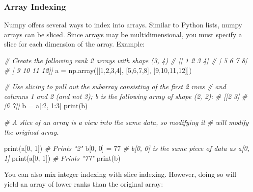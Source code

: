 \documentclass[
]{article}
\newenvironment{Shaded}{}{}
\newcommand{\BuiltInTok}[1]{#1}
\newcommand{\CommentTok}[1]{\textcolor[rgb]{0.38,0.63,0.69}{\textit{#1}}}
\newcommand{\DecValTok}[1]{\textcolor[rgb]{0.25,0.63,0.44}{#1}}
\newcommand{\NormalTok}[1]{#1}
\newcommand{\OperatorTok}[1]{\textcolor[rgb]{0.40,0.40,0.40}{#1}}
\begin{document}
\hypertarget{array-indexing}{%
\subsubsection{Array Indexing}\label{array-indexing}}

Numpy offers several ways to index into arrays. Similar to Python lists,
numpy arrays can be sliced. Since arrays may be multidimensional, you
must specify a slice for each dimension of the array. Example:

\begin{Shaded}
\begin{Highlighting}[]
\CommentTok{\# Create the following rank 2 arrays with shape (3, 4)}
\CommentTok{\# [[ 1  2  3  4]}
\CommentTok{\#  [ 5  6  7  8]}
\CommentTok{\#  [ 9 10 11 12]]}
\NormalTok{a }\OperatorTok{=}\NormalTok{ np.array([[}\DecValTok{1}\NormalTok{,}\DecValTok{2}\NormalTok{,}\DecValTok{3}\NormalTok{,}\DecValTok{4}\NormalTok{], }
\NormalTok{              [}\DecValTok{5}\NormalTok{,}\DecValTok{6}\NormalTok{,}\DecValTok{7}\NormalTok{,}\DecValTok{8}\NormalTok{], }
\NormalTok{              [}\DecValTok{9}\NormalTok{,}\DecValTok{10}\NormalTok{,}\DecValTok{11}\NormalTok{,}\DecValTok{12}\NormalTok{]])}

\CommentTok{\# Use slicing to pull out the subarray consisting of the first 2 rows}
\CommentTok{\# and columns 1 and 2 (and not 3); b is the following array of shape (2, 2):}
\CommentTok{\# [[2 3]}
\CommentTok{\#  [6 7]]}
\NormalTok{b }\OperatorTok{=}\NormalTok{ a[:}\DecValTok{2}\NormalTok{, }\DecValTok{1}\NormalTok{:}\DecValTok{3}\NormalTok{]}
\BuiltInTok{print}\NormalTok{(b)}

\CommentTok{\# A slice of an array is a view into the same data, so modifying it}
\CommentTok{\# will modify the original array.}

\BuiltInTok{print}\NormalTok{(a[}\DecValTok{0}\NormalTok{, }\DecValTok{1}\NormalTok{])   }\CommentTok{\# Prints "2"}
\NormalTok{b[}\DecValTok{0}\NormalTok{, }\DecValTok{0}\NormalTok{] }\OperatorTok{=} \DecValTok{77}     \CommentTok{\# b[0, 0] is the same piece of data as a[0, 1]}
\BuiltInTok{print}\NormalTok{(a[}\DecValTok{0}\NormalTok{, }\DecValTok{1}\NormalTok{])   }\CommentTok{\# Prints "77"}
\BuiltInTok{print}\NormalTok{(b)}
\end{Highlighting}
\end{Shaded}

You can also mix integer indexing with slice indexing. However, doing so
will yield an array of lower ranks than the original array:
\end{document}
